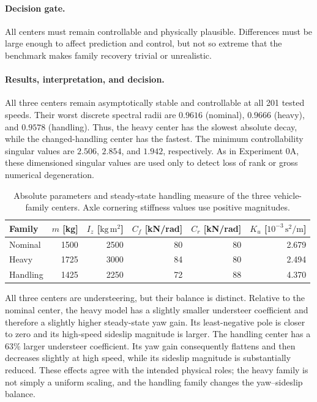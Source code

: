 \paragraph{Decision gate.}
All centers must remain controllable and physically plausible. Differences must
be large enough to affect prediction and control, but not so extreme that the
benchmark makes family recovery trivial or unrealistic.

\paragraph{Results, interpretation, and decision.}
All three centers remain asymptotically stable and controllable at all 201 tested
speeds. Their worst discrete spectral radii are $0.9616$ (nominal), $0.9666$
(heavy), and $0.9578$ (handling). Thus, the heavy center has the slowest absolute
decay, while the changed-handling center has the fastest. The minimum
controllability singular values are $2.506$, $2.854$, and $1.942$, respectively.
As in Experiment 0A, these dimensioned singular values are used only to detect
loss of rank or gross numerical degeneration.

\begin{table}[ht]
\centering
\caption{Absolute parameters and steady-state handling measure of the three
vehicle-family centers. Axle cornering stiffness values use positive magnitudes.}
\label{tab:experiment0b-parameters}
\begin{tabular}{lrrrrr}
\toprule
Family & $m$ [kg] & $I_z$ [$\mathrm{kg\,m^2}$] & $C_f$ [kN/rad]
& $C_r$ [kN/rad] & $K_u$ [$10^{-3}\,\mathrm{s^2/m}$]\\
\midrule
Nominal & 1500 & 2500 & 80 & 80 & 2.679\\
Heavy & 1725 & 3000 & 84 & 80 & 2.494\\
Handling & 1425 & 2250 & 72 & 88 & 4.370\\
\bottomrule
\end{tabular}
\end{table}

All three centers are understeering, but their balance is distinct. Relative to
the nominal center, the heavy model has a slightly smaller understeer coefficient
and therefore a slightly higher steady-state yaw gain. Its least-negative pole is
closer to zero and its high-speed sideslip magnitude is larger. The handling
center has a $63\%$ larger understeer coefficient. Its yaw gain consequently
flattens and then decreases slightly at high speed, while its sideslip magnitude
is substantially reduced. These effects agree with the intended physical roles;
the heavy family is not simply a uniform scaling, and the handling family changes
the yaw--sideslip balance.

